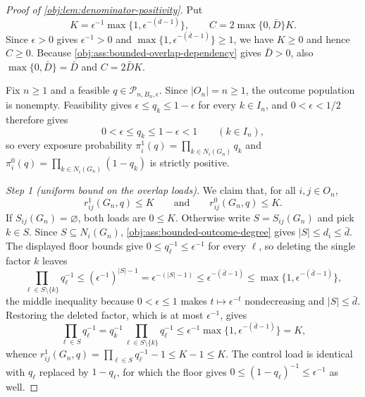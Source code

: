 \begin{proof}[Proof of \cref{obj:lem:denominator-positivity}]
Put
\[
K=\epsilon^{-1}\max\{1,\epsilon^{-(\bar d-1)}\},
\qquad
C=2\max\{0,\bar D\}K .
\]
Since \(\epsilon>0\) gives \(\epsilon^{-1}>0\) and \(\max\{1,\epsilon^{-(\bar d-1)}\}\ge1\), we have \(K\ge0\) and hence \(C\ge0\).
Because \cref{obj:ass:bounded-overlap-dependency} gives \(\bar D>0\), also \(\max\{0,\bar D\}=\bar D\) and \(C=2\bar DK\).

Fix \(n\ge1\) and a feasible \(q\in\mathcal P_{n,B_n,\epsilon}\). Since \(|O_n|=n\ge1\), the outcome population is nonempty. Feasibility gives \(\epsilon\le q_k\le1-\epsilon\) for every \(k\in I_n\), and \(0<\epsilon<1/2\) therefore gives
\[
0<\epsilon\le q_k\le 1-\epsilon<1
\qquad(k\in I_n),
\]
so every exposure probability \(\pi_i^1(q)=\prod_{k\in N_i(G_n)}q_k\) and \(\pi_i^0(q)=\prod_{k\in N_i(G_n)}(1-q_k)\) is strictly positive.

\textit{Step 1 (uniform bound on the overlap loads).} We claim that, for all \(i,j\in O_n\),
\[
r_{ij}^1(G_n,q)\le K
\qquad\text{and}\qquad
r_{ij}^0(G_n,q)\le K .
\]
If \(S_{ij}(G_n)=\varnothing\), both loads are \(0\le K\). Otherwise write \(S=S_{ij}(G_n)\) and pick \(k\in S\). Since \(S\subseteq N_i(G_n)\), \cref{obj:ass:bounded-outcome-degree} gives \(|S|\le d_i\le\bar d\). The displayed floor bounds give \(0\le q_\ell^{-1}\le\epsilon^{-1}\) for every \(\ell\), so deleting the single factor \(k\) leaves
\[
\prod_{\ell\in S\setminus\{k\}}q_\ell^{-1}
\le\left(\epsilon^{-1}\right)^{|S|-1}
=\epsilon^{-(|S|-1)}
\le\epsilon^{-(\bar d-1)}
\le\max\{1,\epsilon^{-(\bar d-1)}\},
\]
the middle inequality because \(0<\epsilon\le1\) makes \(t\mapsto\epsilon^{-t}\) nondecreasing and \(|S|\le\bar d\). Restoring the deleted factor, which is at most \(\epsilon^{-1}\), gives
\[
\prod_{\ell\in S}q_\ell^{-1}
=q_k^{-1}\prod_{\ell\in S\setminus\{k\}}q_\ell^{-1}
\le\epsilon^{-1}\max\{1,\epsilon^{-(\bar d-1)}\}=K,
\]
whence \(r_{ij}^1(G_n,q)=\prod_{\ell\in S}q_\ell^{-1}-1\le K-1\le K\). The control load is identical with \(q_\ell\) replaced by \(1-q_\ell\), for which the floor gives \(0\le(1-q_\ell)^{-1}\le\epsilon^{-1}\) as well.


\end{proof}
